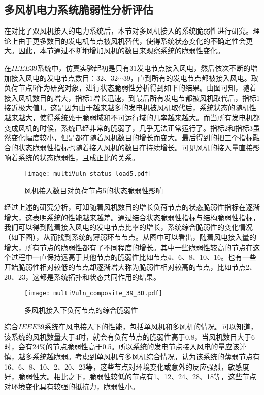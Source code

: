 \subsection{多风机电力系统脆弱性分析评估}
\label{sec:multiAnalysis}
在对比了双风机接入的电力系统后，本节对多风机接入的系统脆弱性进行研究。理论上由于更多数目的发电机节点被风机替代，使得系统状态变化的不确定性会更大。因此，本节通过不断地增加风机的数目来观察系统的脆弱性变化。

在$IEEE39$系统中，仿真实验起初是只有31发电节点接入风电，然后依次不断的增加接入风电的发电节点数目：32、32$\cdots$39，直到所有的发电节点都被接入风电。取负荷节点5作为研究对象，进行状态脆弱性分析得到如下的结果。由图可知，随着接入风机数目的增大，指标1增长迅速，到最后所有发电节都被风机取代后，指标1接近极大值1。这是因为由于越来越多的发电机被风机取代后，系统状态的随机性越来越大，使得系统处于脆弱域和不可运行域的几率越来越大。而当所有发电机都变成风机的时候，系统已经非常的脆弱了，几乎无法正常运行了。指标2和指标3虽然变化幅度较小，但是都在随着风机数目的增长而变大。最后得到的把三个指标融合的状态脆弱性指标也随着接入风机的数目在持续增长。可见风机的接入量直接影响着系统的状态脆弱性，且成正比的关系。
\begin{figure}[H] %
  \centering
  \texttt{[image: multiVuln\_status\_load5.pdf]}
  \caption{风机接入数目对负荷节点5的状态脆弱性影响}
  \label{fig:multiVuln_status_load5}
\end{figure}

经过上述的研究分析，可知随着风机数目的增长负荷节点的状态脆弱性指标在逐渐增大，这表明系统的性能越来越差。通过结合状态脆弱性指标与结构脆弱性指标，我们可以得到随着接入风电的发电节点比率的增长，系统综合脆弱性的变化情况（如下图），从而找到系统的薄弱环节节点。从图中可以看出，随着风电接入量的增大，所有节点的脆弱性都有了不同程度的增长。其中一些脆弱性较高的节点在这个过程中一直保持远高于其他节点的脆弱性比如节点4、6、8、10、16。也有一些开始脆弱性相对较低的节点却逐渐增大称为脆弱性相对较高的节点，比如节点2、20、23，这都是系统拓扑和状态共同作用的结果。
\begin{figure}[H] %
  \centering
  \texttt{[image: multiVuln\_composite\_39\_3D.pdf]}
  \caption{多风机接入下负荷节点的综合脆弱性}
  \label{fig:multiVuln_composite_39_3D}
\end{figure}

综合$IEEE39$系统在风电接入下的性能，包括单风机和多风机的情况。可以知道，该系统的风机数量大于4时，就会有负荷节点的脆弱性高于0.8，当风机数目大于6时，会有$24\%$的节点脆弱性高于0.5。所以系统的发电节点接入风电的量应该谨慎，越多系统越脆弱。考虑到单风机与多风机综合情况，认为该系统的薄弱节点有16、6、8、10、2、20、23等，这些节点对环境变化或意外的反应强烈，敏感度好，脆弱性大。相比之下，脆弱性较低的节点有1、12、24、28、18等，这些节点对环境变化具有较强的抵抗力，脆弱性小。
